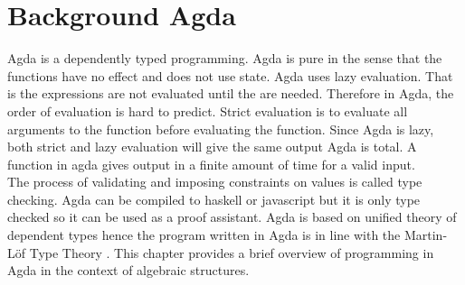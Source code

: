 \chapter{Background Agda}
Agda is a dependently typed programming. Agda is pure in the sense that the functions have no effect and does not use state. Agda uses lazy evaluation. That is the expressions are not evaluated until the are needed. Therefore in Agda, the order of evaluation is hard to predict. Strict evaluation is to evaluate all arguments to the function before evaluating the function. Since Agda is lazy, both strict and lazy evaluation will give the same output \cite{kidney2020finiteness} Agda is total. A function in agda gives output in a finite amount of time for a valid input.\\
The process of validating and imposing constraints on values is called type checking. Agda can be compiled to haskell or javascript but it is only type checked so it can be used as a proof assistant. Agda is based on unified theory of dependent types \cite{enwiki:1127496533} hence the program written in Agda is in line with the Martin-Löf Type Theory \cite{kidney2020finiteness}. This chapter provides a brief overview of programming in Agda in the context of algebraic structures. 


